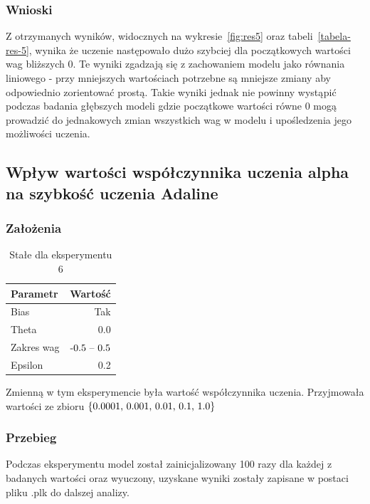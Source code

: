 \documentclass{article}
\begin{document}
\subsubsection*{Wnioski}

Z otrzymanych wyników, widocznych na wykresie~\ref{fig:res5} oraz tabeli~\ref{tabela-res-5}, wynika że uczenie następowało dużo szybciej dla początkowych wartości wag bliższych 0. Te wyniki zgadzają się z zachowaniem modelu jako równania liniowego - przy mniejszych wartościach potrzebne są mniejsze zmiany aby odpowiednio zorientować prostą. Takie wyniki jednak nie powinny wystąpić podczas badania głębszych modeli gdzie początkowe wartości równe 0 mogą prowadzić do jednakowych zmian wszystkich wag w modelu i upośledzenia jego możliwości uczenia.

\newpage
\subsection{Wpływ wartości współczynnika uczenia alpha na szybkość uczenia Adaline}
\subsubsection*{Założenia}

\begin{table}[!h]
	\caption{Stałe dla eksperymentu 6}
	\label{tabela-const-6}
	\centering
	\begin{tabular}{lr}
		\toprule
		Parametr   & Wartość         \\
		\midrule
		Bias       & Tak               \\
		Theta      & 0.0               \\
		Zakres wag & \($-0.5 -- 0.5$\) \\
		Epsilon    & 0.2               \\
		\bottomrule
	\end{tabular}
\end{table}

Zmienną w tym eksperymencie była wartość współczynnika uczenia. Przyjmowała wartości ze zbioru \(\{$0.0001, 0.001, 0.01, 0.1, 1.0$\}\)

\subsubsection*{Przebieg}

Podczas eksperymentu model został zainicjalizowany 100 razy dla każdej z badanych wartości oraz wyuczony, uzyskane wyniki zostały zapisane w postaci pliku .plk do dalszej analizy.
\end{document}
